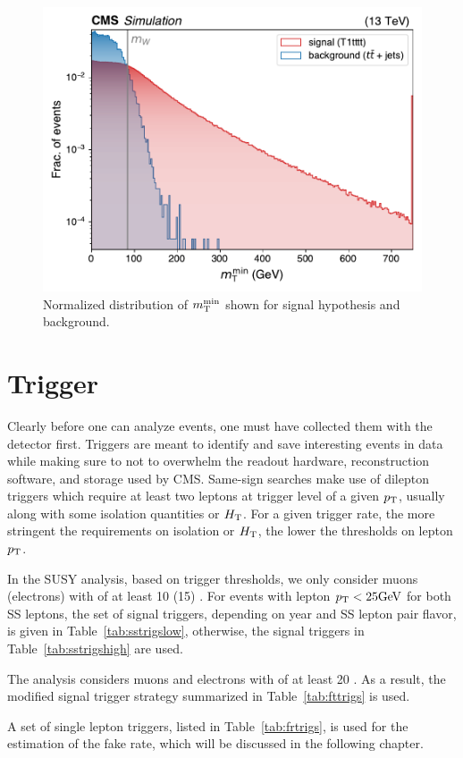 \begin{figure}[!hbtp]
\centering
\includegraphics[width=.60\textwidth]{figs/misc/mtmin_signal_ttbar.pdf}
\caption{
    Normalized distribution of $m_{\mathrm{T}}^{\text{min}}$ shown for signal hypothesis \Totttt and 
    \ttbar background.
}
\label{fig:mtminttbar}
\end{figure}

\section{Trigger}

Clearly before one can analyze events, one must have collected them with the detector first.
Triggers are meant to identify and save interesting events in data while making sure to not to overwhelm
the readout hardware, reconstruction software, and storage used by CMS. 
Same-sign searches make use of dilepton triggers
which require at least two leptons at trigger level of a given $p_{\mathrm{T}}$, usually along with some
isolation quantities or $H_{\mathrm{T}}$. For a given trigger rate, 
the more stringent the requirements on isolation or $H_{\mathrm{T}}$, the
lower the thresholds on lepton $p_{\mathrm{T}}$.

In the SUSY analysis, based on trigger thresholds, 
we only consider muons (electrons) with \pt of at least 10 (15) \GeV.
For events with lepton $p_{\mathrm{T}} < 25\text{GeV}$ for both SS leptons, the set of signal triggers, depending on year
and SS lepton pair flavor, is given in Table~\ref{tab:sstrigslow}, otherwise, the signal triggers in 
Table~\ref{tab:sstrigshigh} are used.

The \smft analysis considers muons and electrons with \pt of at least 20 \GeV. As a result,
the modified signal trigger strategy summarized in Table~\ref{tab:fttrigs} is used.

A set of single lepton triggers, listed in Table~\ref{tab:frtrigs},
is used for the estimation of the fake rate, which
will be discussed in the following chapter.

